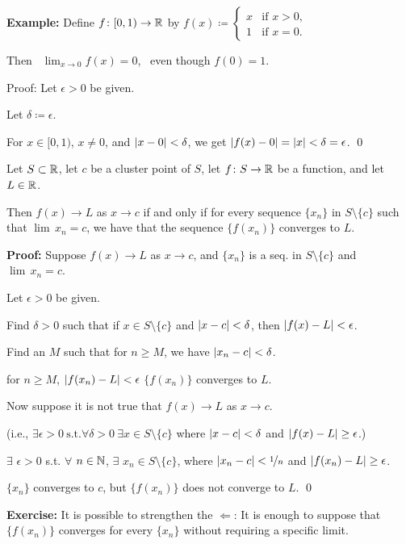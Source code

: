 \documentclass[10pt,aspectratio=169]{beamer}
\begin{document}
\begin{frame}

\textbf{Example:}
Define $f \colon [0,1) \to {\mathbb{R}}$ by
\quad
$\displaystyle
f(x) \coloneqq 
\begin{cases}
x & \text{if } x > 0 , \\
1 & \text{if } x = 0 .
\end{cases}$

\pause
\medskip

Then
~$\displaystyle\lim_{x\to 0} f(x) = 0$,~
even though $f(0) = 1$.

\pause
\medskip

Proof:  Let $\epsilon > 0$ be given.

\pause
Let $\delta \coloneqq \epsilon$.

\pause
For $x \in [0,1)$, $x \not= 0$, and $\left\lvert {x-0} \right\rvert < \delta$, we get
\quad
$\left\lvert {f(x) - 0} \right\rvert = \left\lvert {x} \right\rvert < \delta = \epsilon$.
\qed

\end{frame}

\begin{frame}
\begin{lemma}
Let $S \subset {\mathbb{R}}$, let $c$ be a cluster point of $S$, let $f \colon S \to
{\mathbb{R}}$ be a function, and let $L \in {\mathbb{R}}$.

\pause
Then
$f(x) \to L$ as $x \to c$ if and only if for every sequence $\{ x_n \}$ in
$S \setminus \{c\}$
such that $\lim\, x_n = c$,
we have that the sequence $\{ f(x_n) \}$ converges to $L$.
\end{lemma}

\pause
\textbf{Proof:}
Suppose $f(x) \to L$ as $x \to c$, and $\{ x_n \}$ is a seq. in
$S \setminus \{c\}$ and $\lim\, x_n = c$.

\pause
Let $\epsilon > 0$ be given.

\pause
Find $\delta > 0$ such that
if $x \in S \setminus \{c\}$ and $\left\lvert {x-c} \right\rvert < \delta$, then
$\left\lvert {f(x) - L} \right\rvert < \epsilon$.

\pause
Find an $M$ such that for $n \geq M$, we have $\left\lvert {x_n - c} \right\rvert < \delta$.

\pause
\thus \quad for $n \geq M$, \quad
$\left\lvert {f(x_n) - L} \right\rvert < \epsilon$
\pause
\wthus $\{ f(x_n) \}$ converges to $L$.

\pause
\medskip

Now suppose
it is not true that $f(x) \to L$ as $x \to c$.

\pause
(i.e., $\exists \epsilon > 0 ~ \text{s.t.} \forall \delta > 0 ~ \exists x \in S
\setminus \{ c \}$ where $\left\lvert {x-c} \right\rvert < \delta$ and $\left\lvert {f(x)-L} \right\rvert \geq
\epsilon$.)

\pause
\thus \quad 
$\exists$ $\epsilon > 0$ s.t. $\forall$ $n \in {\mathbb{N}}$,
$\exists$ $x_n \in S \setminus \{c\}$, where
$\left\lvert {x_n-c} \right\rvert < \nicefrac{1}{n}$ and $\left\lvert {f(x_n)-L} \right\rvert \geq \epsilon$.

\pause
$\{ x_n \}$ converges to $c$, but
$\{ f(x_n) \}$ does not converge to $L$.
\qed

\pause
\medskip

\textbf{Exercise:} It is possible to strengthen the $\Leftarrow$:
It is enough to suppose that
$\{ f(x_n) \}$ converges for every $\{ x_n \}$ without requiring a specific limit.
\end{frame}
\end{document}
